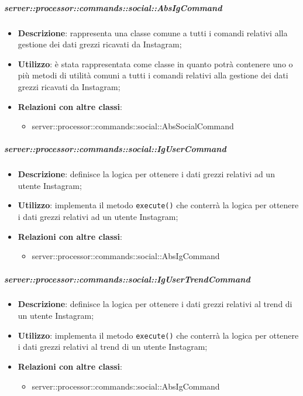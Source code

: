         \subparagraph{server::processor::commands::social::AbsIgCommand} %
        \label{subp:bdsm_app_server_processor_commands_social_absigcommand}
        \begin{itemize}
          \item \textbf{Descrizione}: rappresenta una classe comune a tutti i comandi relativi alla gestione dei dati grezzi ricavati da Instagram;
          \item \textbf{Utilizzo}: è stata rappresentata come classe in quanto potrà contenere uno o più metodi di utilità comuni a tutti i comandi relativi alla gestione dei dati grezzi ricavati da Instagram;
          \item \textbf{Relazioni con altre classi}:
            \begin{itemize}
              \item server::processor::commands::social::AbsSocialCommand
            \end{itemize}
        \end{itemize}

        \subparagraph{server::processor::commands::social::IgUserCommand} %
        \label{subp:bdsm_app_server_processor_commands_social_igusercommand}
        \begin{itemize}
          \item \textbf{Descrizione}: definisce la logica per ottenere i dati grezzi relativi ad un utente Instagram;
          \item \textbf{Utilizzo}: implementa il metodo \texttt{execute()} che conterrà la logica per ottenere i dati grezzi relativi ad un utente Instagram;
          \item \textbf{Relazioni con altre classi}:
            \begin{itemize}
              \item server::processor::commands::social::AbsIgCommand
            \end{itemize}
        \end{itemize}

        \subparagraph{server::processor::commands::social::IgUserTrendCommand} %
        \label{subp:bdsm_app_server_processor_commands_social_igusertrendcommand}
        \begin{itemize}
          \item \textbf{Descrizione}: definisce la logica per ottenere i dati grezzi relativi al trend di un utente Instagram;
          \item \textbf{Utilizzo}: implementa il metodo \texttt{execute()} che conterrà la logica per ottenere i dati grezzi relativi al trend di un utente Instagram;
          \item \textbf{Relazioni con altre classi}:
            \begin{itemize}
              \item server::processor::commands::social::AbsIgCommand
            \end{itemize}
        \end{itemize}


